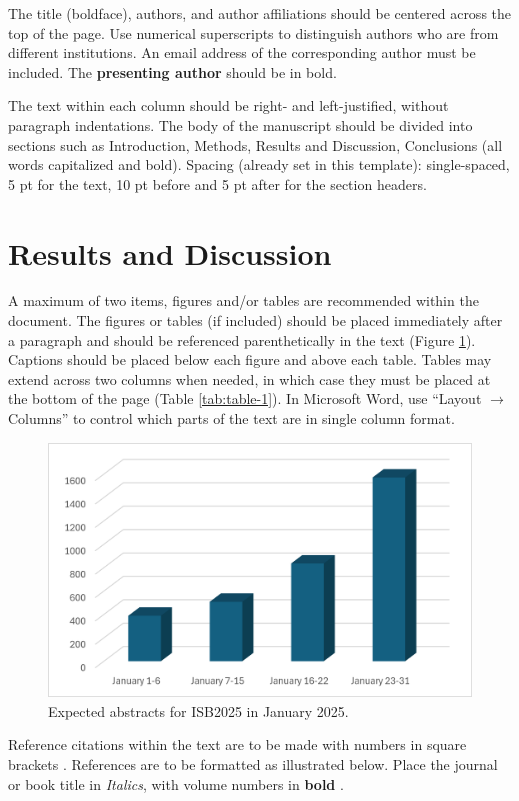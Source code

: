 \documentclass[10pt, letter, twocolumn]{article}
\begin{document}
The title (boldface), authors, and author affiliations should be centered across the top of the page. Use numerical superscripts to distinguish authors who are from different institutions. An email address of the corresponding author must be included. The \textbf{presenting author} should be in bold.

The text within each column should be right- and left-justified, without paragraph indentations. The body of the manuscript should be divided into sections such as Introduction, Methods, Results and Discussion, Conclusions (all words capitalized and bold). Spacing (already set in this template): single-spaced, 5 pt for the text, 10 pt before and 5 pt after for the section headers.

\section*{Results and Discussion}
A maximum of two items, figures and/or tables are recommended within the document. The figures or tables (if included) should be placed immediately after a paragraph and should be referenced parenthetically in the text (Figure \ref{fig:expected-abstracts}). Captions should be placed below each figure and above each table. Tables may extend across two columns when needed, in which case they must be placed at the bottom of the page (Table \ref{tab:table-1}). In Microsoft Word, use “Layout $\rightarrow$ Columns” to control which parts of the text are in single column format.
\begin{figure}[H]
    \centering
    \includegraphics[width=\linewidth]{isb-figure.png} %
    \caption{Expected abstracts for ISB2025 in January 2025.}
    \label{fig:expected-abstracts}
\end{figure}
Reference citations within the text are to be made with numbers in square brackets \cite{author2023, someauthor2023}. References are to be formatted as illustrated below. Place the journal or book title in \textit{Italics}, with volume numbers in \textbf{bold} \cite{author2023b}. 
\end{document}
